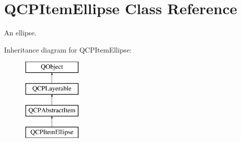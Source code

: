 \hypertarget{class_q_c_p_item_ellipse}{}\section{Q\+C\+P\+Item\+Ellipse Class Reference}
\label{class_q_c_p_item_ellipse}


An ellipse.  


Inheritance diagram for Q\+C\+P\+Item\+Ellipse\+:\begin{figure}[H]
\begin{center}
\leavevmode
\includegraphics[height=4.000000cm]{class_q_c_p_item_ellipse}
\end{center}
\end{figure}
